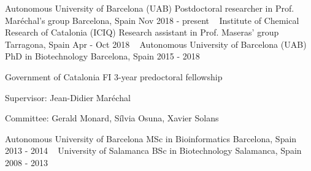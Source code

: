 


\begin{cventries}
  \cventry
    {Autonomous University of Barcelona (UAB)} %
    {Postdoctoral researcher in Prof. Maréchal's group} %
    {Barcelona, Spain} %
    {Nov 2018 - present} %
    {~}
  \cventry
    {Institute of Chemical Research of Catalonia (ICIQ)} %
    {Research assistant in Prof. Maseras' group} %
    {Tarragona, Spain} %
    {Apr - Oct 2018} %
    {~}
  \cventry
    {Autonomous University of Barcelona (UAB)} %
    {PhD in Biotechnology} %
    {Barcelona, Spain} %
    {2015 - 2018} %
    {
      \begin{cvitems} %
        \item {Government of Catalonia FI 3-year predoctoral fellowship}
        \item {Supervisor: Jean-Didier Maréchal}
        \item {Committee: Gerald Monard, Sílvia Osuna, Xavier Solans\\}
      \end{cvitems}
    }
  \cventry
    {Autonomous University of Barcelona} %
    {MSc in Bioinformatics} %
    {Barcelona, Spain} %
    {2013 - 2014} %
    {~}
  \cventry
    {University of Salamanca} %
    {BSc in Biotechnology} %
    {Salamanca, Spain} %
    {2008 - 2013} %
    {~}

\end{cventries}
